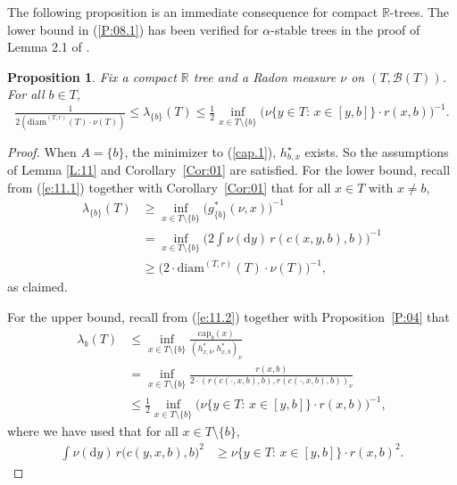 \documentclass[11pt]{amsart}
\numberwithin{equation}{section}
\newtheorem{proposition}[definition]{Proposition}
\begin{document}
{The following proposition is an immediate consequence for compact ${{\mathbb R}}$-trees. The lower bound  in (\ref{P:08.1}) {has been verified for $\alpha$-stable trees} in the proof of Lemma 2.1 of \cite{CroydonHumbly2010}.

\begin{proposition} Fix a compact ${{\mathbb R}}$ tree and a Radon measure $\nu$ on $(T,{\mathcal B}(T))$.
For all $b\in T$,
\label{P:08}
{\begin{equation} \label{P:08.1}
    \tfrac{1}{2\left (\mathrm{diam}^{(T,r)}(T)\cdot\nu(T)\right)}
 \le
    \lambda_{\{b\}}(T)
  \le
   \tfrac{1}{2}\inf_{x\in T\setminus\{b\}}\big(\nu\big\{y\in T:\,x\in[y,b]\big\}\cdot r(x,b)\big)^{-1}.
\end{equation}}
\end{proposition}{\smallskip}

\begin{proof} When $A= \{b\}$, the minimizer to (\ref{cap.1}),  $h^{\star}_{b,x}$ exists.  So the assumptions of Lemma \ref{L:11} and Corollary~\ref{Cor:01} are satisfied.
For the {{\it} lower bound}, recall from (\ref{e:11.1}) together with Corollary~\ref{Cor:01} that for all $x\in T$ with $x\not=b$,
\begin{equation}\label{newe}
\begin{aligned}
   \lambda_{\{b\}}(T)
 &\ge
   \inf_{x\in T\setminus\{b\}}\big(g^\ast_{\{b\}}(\nu,x)\big)^{-1}
  \\
 &=
   \inf_{x\in T\setminus\{b\}}\big(2\int\nu(\mathrm{d}y)\,r(c(x,y,b),b)\big)^{-1}
  \\
 &\ge
   \big(2\cdot\mathrm{diam}^{(T,r)}(T)\cdot\nu(T)\big)^{-1},
\end{aligned}
\end{equation}
as claimed. {\smallskip}

For the {{\it} upper bound}, recall from (\ref{e:11.2}) together with Proposition~\ref{P:04} that
\begin{equation}\label{upper}
\begin{aligned}
  \lambda_b(T)
 &\le
   \inf_{x\in T\setminus\{b\}}\frac{{\mathrm{cap}_{b}(x)}}{(h^\ast_{x,b},h^\ast_{x,b})_{\nu}}
  \\
 &=
   \inf_{x\in T\setminus\{b\}}\frac{r(x,b)}{2\cdot (r(c(\boldsymbol{\cdot},x,b),b),r(c(\boldsymbol{\cdot},x,b),b))_{\nu}}
  \\
 &\le
   \tfrac{1}{2}\inf_{x\in T\setminus\{b\}}\big(\nu\big\{y\in T:\,x\in[y,b]\big\}\cdot r(x,b)\big)^{-1},
\end{aligned}
\end{equation}
where we have used that for all $x\in T\setminus\{b\}$,
\begin{equation}\label{P:08.4}
\begin{aligned}
   \int\nu(\mathrm{d}y)\,r\big(c(y,x,b),b\big)^2
  &\ge
   \nu\big\{y\in T:\,x\in[y,b]\big\}\cdot r(x,b)^2.
\end{aligned}
\end{equation}
\end{proof}{\smallskip}

}
\end{document}
